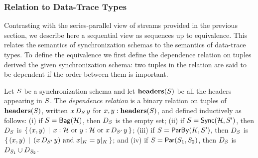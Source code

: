 \subsubsection{Relation to Data-Trace Types}

Contrasting with the series-parallel view of streams provided in the previous section, we describe here
a sequential view as sequences up to equivalence.
This relates the semantics of synchronization schemas to the semantics of data-trace types.
To define the equivalence we first define the dependence relation on tuples
derived the given synchronization schema: two tuples in the relation are said to be dependent if the order between them is important.

\begin{definition}
\label{def:dep-relation}
Let $\ss$ be a synchronization schema and let $\headers(\ss)$ be all the headers appearing in $\ss$.
The \emph{dependence relation} is a binary relation on tuples of $\headers(\ss)$, written $x\, D_{\ss}\, y$ for $x, y: \headers(\ss)$, and defined inductively as follows:
(i) if $\ss = \relleaf{\mathcal{H}}$, then $D_{\ss}$ is the empty set;
(ii) if $\ss = \hier{\mathcal{H}}{\ss'}$, then
$D_{\ss}$ is $\{\, (x, y)\,\mid\,
    x : \mathcal{H}
    \text{ or } y : \mathcal{H}
    \text{ or } x\, D_{\ss'}\, y\,\}$;
(iii) if $\ss = \keyby{K}{\ss'}$, then
$D_{\ss}$ is $\{\, (x, y) \,\mid\,
    (x\, D_{\ss'}\, y) \text{ and } \tuprestrict{x}{K} = \tuprestrict{y}{K}\,\}$; and
(iv) if $\ss = \parcomp{\ss_1}{\ss_2}$, then
$D_{\ss}$ is $D_{\ss_1} \cup D_{\ss_2}$.
\end{definition}

